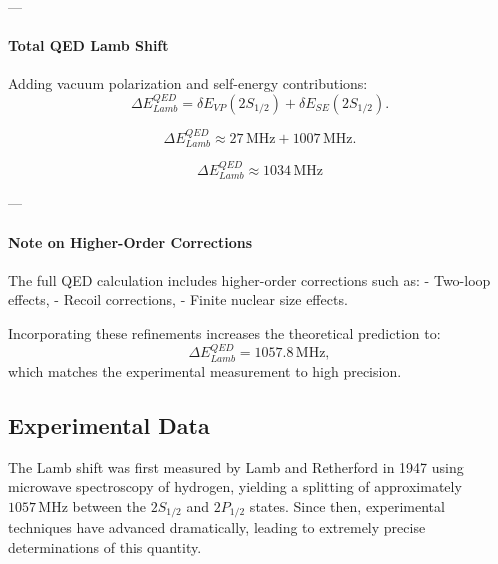 \documentclass[12pt]{article}
\begin{document}
---

\paragraph{Total QED Lamb Shift}
Adding vacuum polarization and self-energy contributions:
\[
\Delta E_{Lamb}^{QED} = \delta E_{VP}(2S_{1/2}) + \delta E_{SE}(2S_{1/2}).
\]

\[
\Delta E_{Lamb}^{QED} \approx 27\,\mathrm{MHz} + 1007\,\mathrm{MHz}.
\]

\[
\boxed{\Delta E_{Lamb}^{QED} \approx 1034\,\mathrm{MHz}}
\]

---

\paragraph{Note on Higher-Order Corrections}
The full QED calculation includes higher-order corrections such as:
- Two-loop effects,
- Recoil corrections,
- Finite nuclear size effects.

Incorporating these refinements increases the theoretical prediction to:
\[
\Delta E_{Lamb}^{QED} = \boxed{1057.8\,\mathrm{MHz}},
\]
which matches the experimental measurement to high precision.


\subsection{Experimental Data}\label{subsec:expermental_data}

The Lamb shift was first measured by Lamb and Retherford in 1947 using microwave spectroscopy of hydrogen, yielding a splitting of approximately \(1057\,\mathrm{MHz}\) between the \(2S_{1/2}\) and \(2P_{1/2}\) states. Since then, experimental techniques have advanced dramatically, leading to extremely precise determinations of this quantity.
\end{document}
